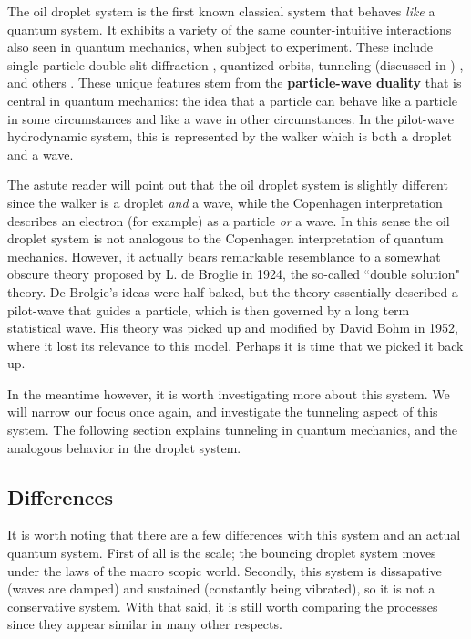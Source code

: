The oil droplet system is the first known classical system that behaves \textit{like} a quantum system. It exhibits a variety of the same counter-intuitive interactions also seen in quantum mechanics, when subject to experiment. These include single particle double slit diffraction , quantized orbits, tunneling (discussed in ) , and others . These unique features stem from the \textbf{particle-wave duality} that is central in quantum mechanics: the idea that a particle can behave like a particle in some circumstances and like a wave in other circumstances. In the pilot-wave hydrodynamic system, this is represented by the walker which is both a droplet and a wave.

The astute reader will point out that the oil droplet system is slightly different since the walker is a droplet \textit{and} a wave, while the Copenhagen interpretation describes an electron (for example) as a particle \textit{or} a wave. In this sense the oil droplet system is not analogous to the Copenhagen interpretation of quantum mechanics. However, it actually bears remarkable resemblance to a somewhat obscure theory proposed by L. de Broglie in 1924, the so-called ``double solution" theory. De Brolgie's ideas were half-baked, but the theory essentially described a pilot-wave that guides a particle, which is then governed by a long term statistical wave. His theory was picked up and modified by David Bohm in 1952, where it lost its relevance to this model. Perhaps it is time that we picked it back up. 

In the meantime however, it is worth investigating more about this system. We will narrow our focus once again, and investigate the tunneling aspect of this system. The following section explains tunneling in quantum mechanics, and the analogous behavior in the droplet system. 

\subsection{Differences}
It is worth noting that there are a few differences with this system and an actual quantum system. First of all is the scale; the bouncing droplet system moves under the laws of the macro scopic world. Secondly, this system is dissapative (waves are damped) and sustained (constantly being vibrated), so it is not a conservative system. With that said, it is still worth comparing the processes since they appear similar in many other respects.

